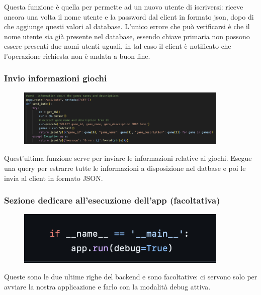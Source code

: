 \documentclass{article}
\begin{document}
Questa funzione è quella per permette ad un nuovo utente di iscriversi: riceve ancora una volta il nome utente e la password dal client in formato json, dopo di che aggiunge questi valori al database.
L’unico errore che può verificarsi è che il nome utente sia già presente nel database, essendo chiave primaria non possono essere presenti due nomi utenti uguali, in tal caso il client è notificato che l’operazione richiesta non è andata a buon fine.

\subsubsection{Invio informazioni giochi}
\begin{figure}[H]
    \centering
    \includegraphics[width=0.9\textwidth]{images/game_info.png}
\end{figure}
Quest'ultima funzione serve per inviare le informazioni relative ai giochi.
Esegue una query per estrarre tutte le informazioni a disposizione nel datbase e poi le invia al client in formato JSON. 

\subsubsection{Sezione dedicare all'esecuzione dell'app (facoltativa)}
\begin{figure}[H]
    \centering
    \includegraphics[width=0.9\textwidth]{images/esecuzione_app.png}
\end{figure}

Queste sono le due ultime righe del backend e sono facoltative: ci servono solo per avviare la nostra applicazione e farlo con la modalità debug attiva.
\end{document}
